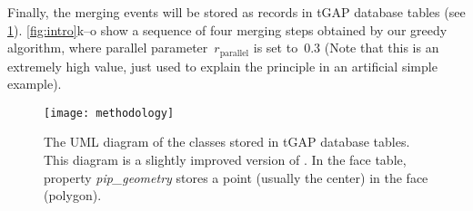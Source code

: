\documentclass{ica}
\begin{document}

Finally, the merging events will be stored 
as records in tGAP database tables
(see \fig\ref{fig:uml_tgap}).
\figs\ref{fig:intro}k--o show a sequence of four merging steps
obtained by our greedy algorithm,
where parallel parameter~$r_\mathrm{parallel}$ is set to~$0.3$
(Note that this is an extremely high value, 
just used to explain the principle in an artificial simple example).



\begin{figure}[tb]
\centering
\texttt{[image: methodology]}
\caption{The UML diagram of the classes stored in tGAP database tables.
This diagram is a slightly improved version of \citet[]{Meijers2011Thesis}.
In the face table, property \emph{pip\_geometry} 
stores a point (usually the center) in the face (polygon).
}
\label{fig:uml_tgap}
\end{figure}
\end{document}
